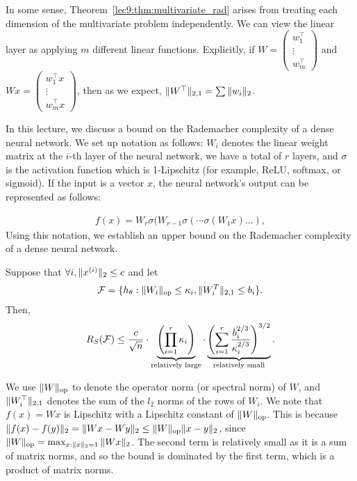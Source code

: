 \begin{remark}
    In some sense, Theorem~\ref{lec9:thm:multivariate_rad} arises from treating each dimension of the multivariate problem independently. We can view the linear layer as applying $m$ different linear functions. Explicitly, if $W = \begin{pmatrix} w_1^\top \\ \vdots \\ w_m^\top \end{pmatrix}$ and $Wx = \begin{pmatrix} w_1^\top x \\ \vdots \\ w_m^\top x \end{pmatrix}$, then as we expect, $\|W^\top\|_{2,1} = \sum \|w_i\|_2$.
\end{remark}


In this lecture, we discuss a bound on the Rademacher complexity of a dense neural network. We set up notation as follows: $W_i$ denotes the linear weight matrix at the $i$-th layer of the neural network, we have a total of $r$ layers, and $\sigma$ is the activation function which is 1-Lipschitz (for example, ReLU, softmax, or sigmoid). If the input is a vector $x$, the neural network's output can be represented as follows:

\begin{align}
    f(x) = W_r\sigma(W_{r-1}\sigma(\cdots \sigma(W_1x)\ldots),
\end{align}
Using this notation, we establish an upper bound on the Rademacher complexity of a dense neural network.

\begin{theorem}
\label{lec10:thm:dnn_rademacher}
Suppose that $\forall i, \|x^{(i)}\|_2 \leq c$ and let
\begin{align}
    \mathcal F = \{h_\theta : \|W_i\|_{\text{op}} \leq \kappa_i, \|W_i^T\|_{2,1} \leq b_i\}.
\end{align}
Then,
\begin{equation}
    R_S (\mathcal F) \leq \frac{c}{\sqrt{n}} \cdot \underbrace{\left(\prod_{i=1}^r \kappa_i \right)}_{\text{relatively large}} \cdot \underbrace{\left( \sum_{i=1}^r\frac{b_i^{2/3}}{\kappa_i^{2/3}}\right)^{3/2}}_{\text{relatively small}}.
\end{equation}
\end{theorem}

\begin{remark}
    We use $\|W\|_{\textup{op}}$ to denote the operator norm (or spectral norm) of $W$, and $\|W_i^\top\|_{2,1}$ denotes the sum of the $l_2$ norms of the rows of $W_i$. We note that $f(x) = Wx$ is Lipschitz with a Lipschitz constant of $\|W\|_{\textup{op}}$. This is because $\|f(x)-f(y)\|_2 = \|Wx-Wy\|_2 \leq \|W\|_{\textup{op}}\|x-y\|_2$, since $\|W\|_{\textup{op}} = \max_{x:\|x\|_2=1}\|Wx\|_2$. The second term is relatively small as it is a sum of matrix norms, and so the bound is dominated by the first term, which is a product of matrix norms.
\end{remark}

